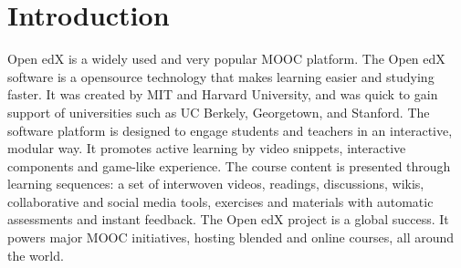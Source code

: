 \chapter{Introduction}

Open edX is a widely used and very popular MOOC platform. The Open edX software is a opensource
technology that makes learning easier and studying faster. It was created by MIT and
Harvard University, and was quick to gain support of universities such as UC Berkely, Georgetown,
and Stanford.
The software platform is designed to engage students and teachers in an interactive, modular way. It
promotes active learning by video snippets, interactive components and game-like experience. The
course content is presented through learning sequences: a set of interwoven videos, readings,
discussions, wikis, collaborative and social media tools, exercises and materials with automatic
assessments and instant feedback.
The Open edX project is a global success. It powers major MOOC initiatives, hosting blended and
online courses, all around the world.